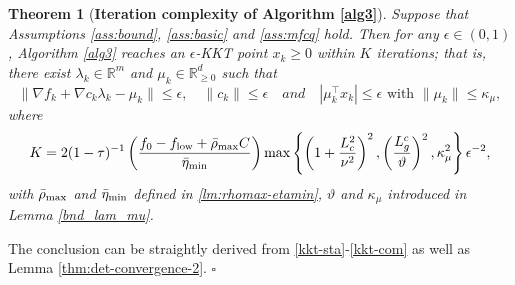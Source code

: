 \documentclass[11pt]{article}
\newtheorem{theorem}{Theorem}
\newenvironment{proof}{{\noindent\it Proof.}\quad}{\hfill $\square$\par}
\newcommand{\R}{\mathbb{R}}
\begin{document}

\begin{theorem}[{\bf Iteration complexity of Algorithm \ref{alg3}}]\label{cor:det-complexity-2}
     Suppose that Assumptions \ref{ass:bound}, \ref{ass:basic} and \ref{ass:mfcq} hold. Then  for any \(\epsilon \in (0,1)\),  Algorithm \ref{alg3} reaches an $\epsilon$-KKT  point \(x_k \ge 0\) within $K$ iterations; that is, there exist \(\lambda_k \in \R^m\) and \(\mu_k \in \R^d_{\ge 0}\) such that
    \[
    \|\nabla f_k + \nabla c_k \lambda_k - \mu_k\| \leq \epsilon, \quad \|c_k\| \leq \epsilon \quad{and}\quad |\mu_k^\top x_k| \leq \epsilon \mbox{ with } \|\mu_k\|\le \kappa_\mu, 
    \]
    where %
    \[
    K= 2(1-\tau)^{-1}\left(\frac{f_0-f_{\rm low}+\bar \rho_{\rm max}C}{\bar \eta_{\rm min}}\right)\max\left\{\left(1+\frac{L_c^2}{\nu^2}\right)^2,\left(\frac{L_g^c}{\vartheta}\right)^2,\kappa_\mu^2\right\}\epsilon^{-2},
    \]
    with $\bar \rho_{\rm max} $ and $\bar \eta_{\rm min}$  defined in \eqref{lm:rhomax-etamin}, $\vartheta$  
    and \(\kappa_\mu\)  introduced in Lemma \ref{bnd_lam_mu}.
\end{theorem}
\begin{proof}
The conclusion can be straightly derived from \eqref{kkt-sta}-\eqref{kkt-com} as well as Lemma \ref{thm:det-convergence-2}.
\end{proof}
\end{document}
